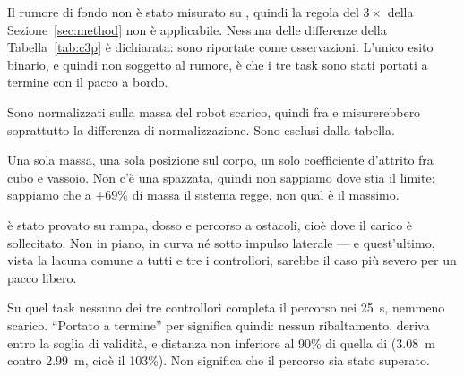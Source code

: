 \begin{description}[style=unboxed,leftmargin=0pt,font=\normalfont\itshape]

\item[Nessun verdetto di dichiarabilità.] Il rumore di fondo non è stato
misurato su \Cthp{}, quindi la regola del $3\times$ della
Sezione~\ref{sec:method} non è applicabile. Nessuna delle differenze della
Tabella~\ref{tab:c3p} è dichiarata: sono riportate come osservazioni. L'unico
esito binario, e quindi non soggetto al rumore, è che i tre task sono stati
portati a termine con il pacco a bordo.

\item[Energia e costo di trasporto non confrontabili.] Sono normalizzati sulla
massa del robot scarico, quindi fra \Cth{} e \Cthp{} misurerebbero soprattutto
la differenza di normalizzazione. Sono esclusi dalla tabella.

\item[Un solo carico.] Una sola massa, una sola posizione sul corpo, un solo
coefficiente d'attrito fra cubo e vassoio. Non c'è una spazzata, quindi non
sappiamo dove stia il limite: sappiamo che a $+69\%$ di massa il sistema
regge, non qual è il massimo.

\item[Solo tre task.] \Cthp{} è stato provato su rampa, dosso e percorso a
ostacoli, cioè dove il carico è sollecitato. Non in piano, in curva né sotto
impulso laterale --- e quest'ultimo, vista la lacuna comune a tutti e tre i
controllori, sarebbe il caso più severo per un pacco libero.

\item[T6 significa una cosa precisa.] Su quel task nessuno dei tre controllori
completa il percorso nei \SI{25}{\second}, nemmeno \Cth{} scarico. ``Portato a
termine'' per \Cthp{} significa quindi: nessun ribaltamento, deriva entro la
soglia di validità, e distanza non inferiore al 90\% di quella di \Cth{}
(\SI{3.08}{\meter} contro \SI{2.99}{\meter}, cioè il 103\%). Non significa che
il percorso sia stato superato.

\end{description}
